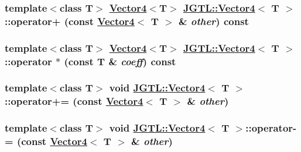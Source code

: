 \hypertarget{class_j_g_t_l_1_1_vector4_fd278c01f6b1464d8c13e79050650229}{
\subsubsection[operator+]{\setlength{\rightskip}{0pt plus 5cm}template$<$class T$>$ \hyperlink{class_j_g_t_l_1_1_vector4}{Vector4}$<$T$>$ \hyperlink{class_j_g_t_l_1_1_vector4}{JGTL::Vector4}$<$ T $>$::operator+ (const \hyperlink{class_j_g_t_l_1_1_vector4}{Vector4}$<$ T $>$ \& {\em other}) const}}
\label{class_j_g_t_l_1_1_vector4_fd278c01f6b1464d8c13e79050650229}


\hypertarget{class_j_g_t_l_1_1_vector4_d829a0db976c6c476776323e33ef41d2}{
\subsubsection[operator $\ast$]{\setlength{\rightskip}{0pt plus 5cm}template$<$class T$>$ \hyperlink{class_j_g_t_l_1_1_vector4}{Vector4}$<$T$>$ \hyperlink{class_j_g_t_l_1_1_vector4}{JGTL::Vector4}$<$ T $>$::operator $\ast$ (const T \& {\em coeff}) const}}
\label{class_j_g_t_l_1_1_vector4_d829a0db976c6c476776323e33ef41d2}


\hypertarget{class_j_g_t_l_1_1_vector4_0baae11e6bb4633d6bf005ecfde8425b}{
\subsubsection[operator+=]{\setlength{\rightskip}{0pt plus 5cm}template$<$class T$>$ void \hyperlink{class_j_g_t_l_1_1_vector4}{JGTL::Vector4}$<$ T $>$::operator+= (const \hyperlink{class_j_g_t_l_1_1_vector4}{Vector4}$<$ T $>$ \& {\em other})}}
\label{class_j_g_t_l_1_1_vector4_0baae11e6bb4633d6bf005ecfde8425b}


\hypertarget{class_j_g_t_l_1_1_vector4_4d5975ec045fa0041c4efe6fdbd5af93}{
\subsubsection[operator-=]{\setlength{\rightskip}{0pt plus 5cm}template$<$class T$>$ void \hyperlink{class_j_g_t_l_1_1_vector4}{JGTL::Vector4}$<$ T $>$::operator-= (const \hyperlink{class_j_g_t_l_1_1_vector4}{Vector4}$<$ T $>$ \& {\em other})}}
\label{class_j_g_t_l_1_1_vector4_4d5975ec045fa0041c4efe6fdbd5af93}


